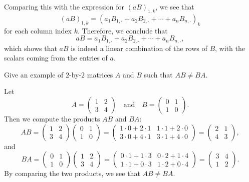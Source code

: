 \begin{exc}
\begin{solution}
Comparing this with the expression for $(aB)_{1,k}$, we see that
\[ (aB)_{1,k} = (a_1B_{1,\cdot}+a_2B_{2,\cdot}+\cdots+a_nB_{n,\cdot})_k \]
for each column index $k$. Therefore, we conclude that
\[ aB = a_1B_{1,\cdot}+a_2B_{2,\cdot}+\cdots+a_nB_{n,\cdot}, \]
which shows that $aB$ is indeed a linear combination of the rows of $B$, with
the scalars coming from the entries of $a$.
\end{solution}

\begin{exercise}
Give an example of $2$-by-$2$ matrices $A$ and $B$ such that $AB\ne BA$.
\end{exercise}
\begin{solution}
Let
\[ A = \begin{pmatrix} 1 & 2\\ 3 & 4 \end{pmatrix} \quad\text{and}\quad
   B = \begin{pmatrix} 0 & 1\\ 1 & 0 \end{pmatrix}. \]
Then we compute the products $AB$ and $BA$:
\[ AB = \begin{pmatrix} 1 & 2\\ 3 & 4 \end{pmatrix}
        \begin{pmatrix} 0 & 1\\ 1 & 0 \end{pmatrix}
      = \begin{pmatrix} 1\cdot0+2\cdot1 & 1\cdot1+2\cdot0\\
                        3\cdot0+4\cdot1 & 3\cdot1+4\cdot0 \end{pmatrix}
      = \begin{pmatrix} 2 & 1\\ 4 & 3 \end{pmatrix}, \]
and
\[ BA = \begin{pmatrix} 0 & 1\\ 1 & 0 \end{pmatrix}
        \begin{pmatrix} 1 & 2\\ 3 & 4 \end{pmatrix}
      = \begin{pmatrix} 0\cdot1+1\cdot3 & 0\cdot2+1\cdot4\\
                        1\cdot1+0\cdot3 & 1\cdot2+0\cdot4 \end{pmatrix}
      = \begin{pmatrix} 3 & 4\\ 1 & 2 \end{pmatrix}. \]
By comparing the two products, we see that $AB\ne BA$.
\end{solution}


\end{exc}
